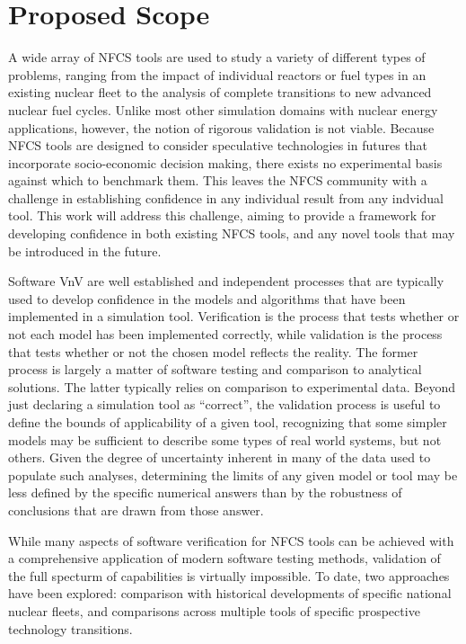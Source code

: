 \section{Proposed Scope}

A wide array of \gls{NFCS} tools\cite{ORION,VISION,CLASS,CYCLUS} are used to study a
variety of different types of problems, ranging from the impact of individual
reactors or fuel types in an existing nuclear fleet\cite{new-technology-study}
to the analysis of complete transitions to new advanced nuclear fuel
cycles\cite{example-transition-scenario}.  Unlike most other simulation
domains with nuclear energy applications, however, the notion of rigorous
validation is not viable.  Because \gls{NFCS} tools are designed to consider
speculative technologies in futures that incorporate socio-economic decision
making, there exists no experimental basis against which to benchmark them.
This leaves the \gls{NFCS} community with a challenge in establishing
confidence in any individual result from any indvidual tool.  This work will
address this challenge, aiming to provide a framework for developing
confidence in both existing \gls{NFCS} tools, and any novel tools that may be
introduced in the future.

Software \gls{VnV} are well established and independent processes that are
typically used to develop confidence in the models and algorithms that have
been implemented in a simulation tool.  Verification is the process that tests
whether or not each model has been implemented correctly, while validation is
the process that tests whether or not the chosen model reflects the reality.
The former process is largely a matter of software testing and comparison to
analytical solutions.  The latter typically relies on comparison to
experimental data.  Beyond just declaring a simulation tool as ``correct'',
the validation process is useful to define the bounds of applicability of a
given tool, recognizing that some simpler models may be sufficient to describe
some types of real world systems, but not others.  Given the degree of
uncertainty inherent in many of the data used to populate such analyses,
determining the limits of any given model or tool may be less defined by the
specific numerical answers than by the robustness of conclusions that are
drawn from those answer.  

While many aspects of software verification for \gls{NFCS} tools can be
achieved with a comprehensive application of modern software testing methods,
validation of the full specturm of capabilities is virtually impossible.  To
date, two approaches have been explored: comparison with historical
developments of specific national nuclear fleets, and comparisons across
multiple tools of specific prospective technology transitions.

